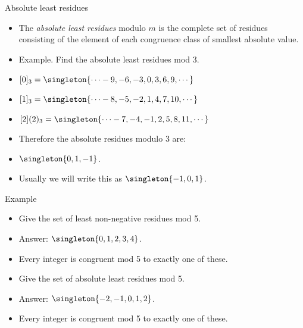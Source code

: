 \documentclass[handout]{beamer}
\begin{document}
\begin{frame}{Absolute least residues}

\begin{itemize}
  \item  The \emph{absolute least residues} modulo $m$ is the complete set of residues
  consisting of the element of each congruence class of smallest absolute value.
  \item Example. Find the absolute least residues mod $3$.
 \item $[0]_3 = \singleton{\cdots -9, -6, -3, 0, 3, 6, 9,\cdots}$
  \item $[1]_3 = \singleton{\cdots -8, -5, -2, 1, 4, 7, 10,\cdots}$
  \item $[2](2)_3 = \singleton{\cdots -7, -4, -1, 2, 5, 8, 11,\cdots}$
  \item Therefore the absolute residues modulo 3 are:
  \item $\singleton{0,1,-1}$.
  \item Usually we will write this as $\singleton{-1,0,1}$.
\end{itemize}

\end{frame}

\begin{frame}{Example}

\begin{itemize}
  \item  Give the set of least non-negative residues mod 5.
  \item Answer: $\singleton{0,1,2,3,4}$.
  \item Every integer is congruent mod 5 to exactly one of these.
  \item Give the set of absolute least residues mod 5.
  \item Answer: $\singleton{-2,-1,0,1,2}$.
  \item Every integer is congruent mod 5 to exactly one of these.
\end{itemize}

\end{frame}
\end{document}
